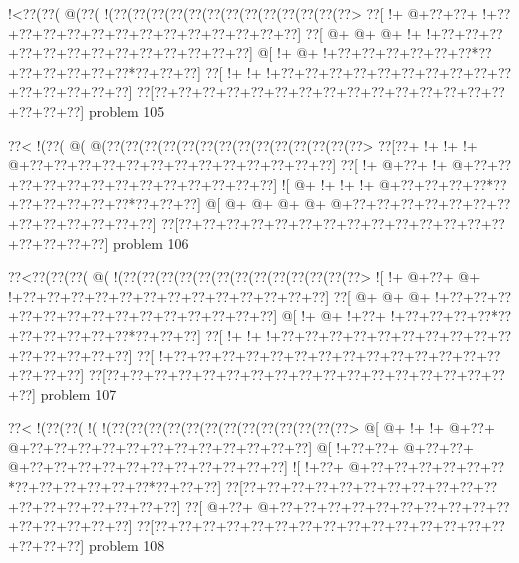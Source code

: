 \vbox{\vbox{\goo
\- !<\0??(\0??(\- @(\0??(\- !(\0??(\0??(\0??(\0??(\0??(\0??(\0??(\0??(\0??(\0??(\0??(\0??(\0??>
\0??[\- !+\- @+\0??+\0??+\- !+\0??+\0??+\0??+\0??+\0??+\0??+\0??+\0??+\0??+\0??+\0??+\0??+\0??]
\0??[\- @+\- @+\- @+\- !+\- !+\0??+\0??+\0??+\0??+\0??+\0??+\0??+\0??+\0??+\0??+\0??+\0??+\0??]
\- @[\- !+\- @+\- !+\0??+\0??+\0??+\0??+\0??+\0??*\0??+\0??+\0??+\0??+\0??+\0??*\0??+\0??+\0??]
\0??[\- !+\- !+\- !+\0??+\0??+\0??+\0??+\0??+\0??+\0??+\0??+\0??+\0??+\0??+\0??+\0??+\0??+\0??]
\0??[\0??+\0??+\0??+\0??+\0??+\0??+\0??+\0??+\0??+\0??+\0??+\0??+\0??+\0??+\0??+\0??+\0??+\0??]
}
\hfil problem 105\hfil\break
}



\vbox{\vbox{\goo
\0??<\- !(\0??(\- @(\- @(\0??(\0??(\0??(\0??(\0??(\0??(\0??(\0??(\0??(\0??(\0??(\0??(\0??(\0??>
\0??[\0??+\- !+\- !+\- !+\- @+\0??+\0??+\0??+\0??+\0??+\0??+\0??+\0??+\0??+\0??+\0??+\0??+\0??]
\0??[\- !+\- @+\0??+\- !+\- @+\0??+\0??+\0??+\0??+\0??+\0??+\0??+\0??+\0??+\0??+\0??+\0??+\0??]
\- ![\- @+\- !+\- !+\- !+\- @+\0??+\0??+\0??+\0??*\0??+\0??+\0??+\0??+\0??+\0??*\0??+\0??+\0??]
\- @[\- @+\- @+\- @+\- @+\- @+\0??+\0??+\0??+\0??+\0??+\0??+\0??+\0??+\0??+\0??+\0??+\0??+\0??]
\0??[\0??+\0??+\0??+\0??+\0??+\0??+\0??+\0??+\0??+\0??+\0??+\0??+\0??+\0??+\0??+\0??+\0??+\0??]
}
\hfil problem 106\hfil\break
}



\vbox{\vbox{\goo
\0??<\0??(\0??(\0??(\- @(\- !(\0??(\0??(\0??(\0??(\0??(\0??(\0??(\0??(\0??(\0??(\0??(\0??(\0??>
\- ![\- !+\- @+\0??+\- @+\- !+\0??+\0??+\0??+\0??+\0??+\0??+\0??+\0??+\0??+\0??+\0??+\0??+\0??]
\0??[\- @+\- @+\- @+\- !+\0??+\0??+\0??+\0??+\0??+\0??+\0??+\0??+\0??+\0??+\0??+\0??+\0??+\0??]
\- @[\- !+\- @+\- !+\0??+\- !+\0??+\0??+\0??+\0??*\0??+\0??+\0??+\0??+\0??+\0??*\0??+\0??+\0??]
\0??[\- !+\- !+\- !+\0??+\0??+\0??+\0??+\0??+\0??+\0??+\0??+\0??+\0??+\0??+\0??+\0??+\0??+\0??]
\0??[\- !+\0??+\0??+\0??+\0??+\0??+\0??+\0??+\0??+\0??+\0??+\0??+\0??+\0??+\0??+\0??+\0??+\0??]
\0??[\0??+\0??+\0??+\0??+\0??+\0??+\0??+\0??+\0??+\0??+\0??+\0??+\0??+\0??+\0??+\0??+\0??+\0??]
}
\hfil problem 107\hfil\break
}



\vbox{\vbox{\goo
\0??<\- !(\0??(\0??(\- !(\- !(\0??(\0??(\0??(\0??(\0??(\0??(\0??(\0??(\0??(\0??(\0??(\0??(\0??>
\- @[\- @+\- !+\- !+\- @+\0??+\- @+\0??+\0??+\0??+\0??+\0??+\0??+\0??+\0??+\0??+\0??+\0??+\0??]
\- @[\- !+\0??+\0??+\- @+\0??+\0??+\- @+\0??+\0??+\0??+\0??+\0??+\0??+\0??+\0??+\0??+\0??+\0??]
\- ![\- !+\0??+\- @+\0??+\0??+\0??+\0??+\0??+\0??*\0??+\0??+\0??+\0??+\0??+\0??*\0??+\0??+\0??]
\0??[\0??+\0??+\0??+\0??+\0??+\0??+\0??+\0??+\0??+\0??+\0??+\0??+\0??+\0??+\0??+\0??+\0??+\0??]
\0??[\- @+\0??+\- @+\0??+\0??+\0??+\0??+\0??+\0??+\0??+\0??+\0??+\0??+\0??+\0??+\0??+\0??+\0??]
\0??[\0??+\0??+\0??+\0??+\0??+\0??+\0??+\0??+\0??+\0??+\0??+\0??+\0??+\0??+\0??+\0??+\0??+\0??]
}
\hfil problem 108\hfil\break
}



